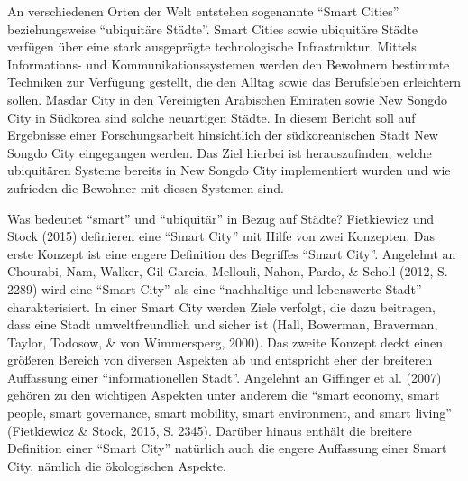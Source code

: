 \documentclass[a4paper,
fontsize=11pt,
oneside,
numbers=noperiodatend,
parskip=half-,
bibliography=totoc,
final
]{scrartcl}
\begin{document}
An verschiedenen Orten der Welt entstehen sogenannte \enquote{Smart
Cities} beziehungsweise \enquote{ubiquitäre Städte}. Smart Cities sowie
ubiquitäre Städte verfügen über eine stark ausgeprägte technologische
Infrastruktur. Mittels Informations- und Kommunikationssystemen werden
den Bewohnern bestimmte Techniken zur Verfügung gestellt, die den Alltag
sowie das Berufsleben erleichtern sollen. Masdar City in den Vereinigten
Arabischen Emiraten sowie New Songdo City in Südkorea sind solche
neuartigen Städte. In diesem Bericht soll auf Ergebnisse einer
Forschungsarbeit hinsichtlich der südkoreanischen Stadt New Songdo City
eingegangen werden. Das Ziel hierbei ist herauszufinden, welche
ubiquitären Systeme bereits in New Songdo City implementiert wurden und
wie zufrieden die Bewohner mit diesen Systemen sind.

Was bedeutet \enquote{smart} und \enquote{ubiquitär} in Bezug auf
Städte? Fietkiewicz und Stock (2015) definieren eine \enquote{Smart
City} mit Hilfe von zwei Konzepten. Das erste Konzept ist eine engere
Definition des Begriffes \enquote{Smart City}. Angelehnt an Chourabi,
Nam, Walker, Gil-Garcia, Mellouli, Nahon, Pardo, \& Scholl (2012, S.
2289) wird eine \enquote{Smart City} als eine \enquote{nachhaltige und
lebenswerte Stadt} charakterisiert. In einer Smart City werden Ziele
verfolgt, die dazu beitragen, dass eine Stadt umweltfreundlich und
sicher ist (Hall, Bowerman, Braverman, Taylor, Todosow, \& von
Wimmersperg, 2000). Das zweite Konzept deckt einen größeren Bereich von
diversen Aspekten ab und entspricht eher der breiteren Auffassung einer
\enquote{informationellen Stadt}. Angelehnt an Giffinger et al. (2007)
gehören zu den wichtigen Aspekten unter anderem die \enquote{smart
economy, smart people, smart governance, smart mobility, smart
environment, and smart living} (Fietkiewicz \& Stock, 2015, S. 2345).
Darüber hinaus enthält die breitere Definition einer \enquote{Smart
City} natürlich auch die engere Auffassung einer Smart City, nämlich die
ökologischen Aspekte.
\end{document}
